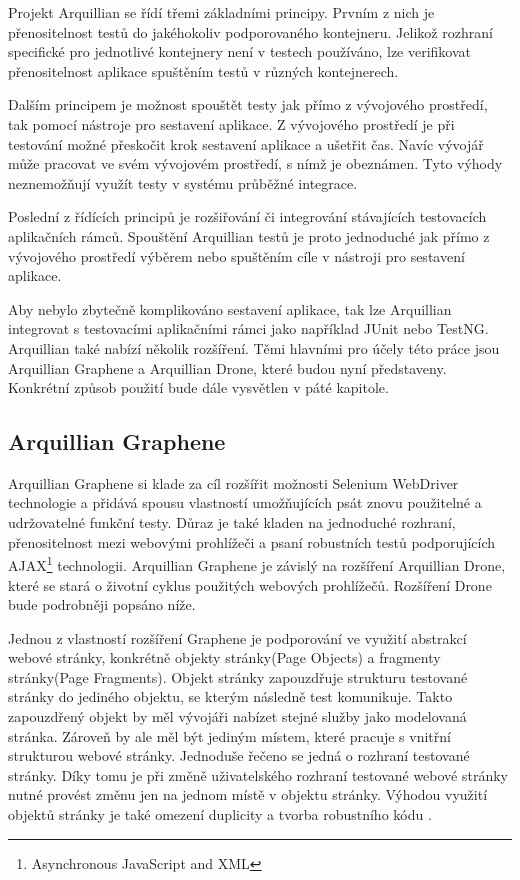 \documentclass[
    color,   %
	table,   %
    twoside, %
]{fithesis3}
\begin{document}
Projekt Arquillian se řídí třemi základními principy. Prvním z nich je přenositelnost testů do jakéhokoliv podporovaného kontejneru. Jelikož rozhraní specifické pro jednotlivé kontejnery není v testech používáno, lze verifikovat přenositelnost aplikace spuštěním testů v různých kontejnerech.

Dalším principem je možnost spouštět testy jak přímo z vývojového prostředí, tak pomocí nástroje pro sestavení aplikace. Z vývojového prostředí je při testování možné přeskočit krok sestavení aplikace a ušetřit čas. Navíc vývojář může pracovat ve svém vývojovém prostředí, s nímž je obeznámen. Tyto výhody neznemožňují využít testy v systému průběžné integrace.

Poslední z řídících principů je rozšiřování či integrování stávajících testovacích aplikačních rámců. Spouštění Arquillian testů je proto jednoduché jak přímo z vývojového prostředí výběrem  nebo spuštěním cíle  v nástroji pro sestavení aplikace.

Aby nebylo zbytečně komplikováno sestavení aplikace, tak lze Arquillian integrovat s testovacími aplikačními rámci jako například JUnit nebo TestNG. Arquillian také nabízí několik rozšíření. Těmi hlavními pro účely této práce jsou Arquillian Graphene a Arquillian Drone, které budou nyní představeny. Konkrétní způsob použití bude dále vysvětlen v páté kapitole.

\subsection{Arquillian Graphene}

Arquillian Graphene si klade za cíl rozšířit možnosti Selenium WebDriver technologie a přidává spousu vlastností umožňujících psát znovu použitelné a udržovatelné funkční testy. Důraz je také kladen na jednoduché rozhraní, přenositelnost mezi webovými prohlížeči a psaní robustních testů podporujících AJAX\footnote{Asynchronous JavaScript and XML} technologii. Arquillian Graphene je závislý na rozšíření Arquillian Drone, které se stará o životní cyklus použitých webových prohlížečů. Rozšíření Drone bude podrobněji popsáno níže.

Jednou z vlastností rozšíření Graphene je podporování ve využití abstrakcí webové stránky, konkrétně objekty stránky(Page Objects) a fragmenty stránky(Page Fragments). Objekt stránky zapouzdřuje strukturu testované stránky do jediného objektu, se kterým následně test komunikuje. Takto zapouzdřený objekt by měl vývojáři nabízet stejné služby jako modelovaná stránka. Zároveň by ale měl být jediným místem, které pracuje s vnitřní strukturou webové stránky. Jednoduše řečeno se jedná o rozhraní testované stránky. Díky tomu je při změně uživatelského rozhraní testované webové stránky nutné provést změnu jen na jednom místě v objektu stránky. Výhodou využití objektů stránky je také omezení duplicity a tvorba robustního kódu \cite{Selenium}.
\end{document}
